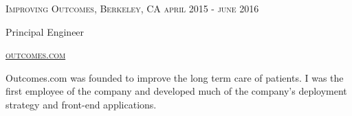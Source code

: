 {
  \textsc{\small{Improving Outcomes, Berkeley, CA
    \hfill
      {\raggedleft
        april 2015 - june 2016
      } \\
    }
  }
  {\raggedright\large {
      Principal Engineer
  }}

  \textsc{\small\href{http://www.outcomes.com}{outcomes.com}}

  \normalsize{\raggedright
    Outcomes.com was founded to improve the long term care of patients. I was the first employee of the company and developed much of the company's deployment strategy and front-end applications. 
  }
}
